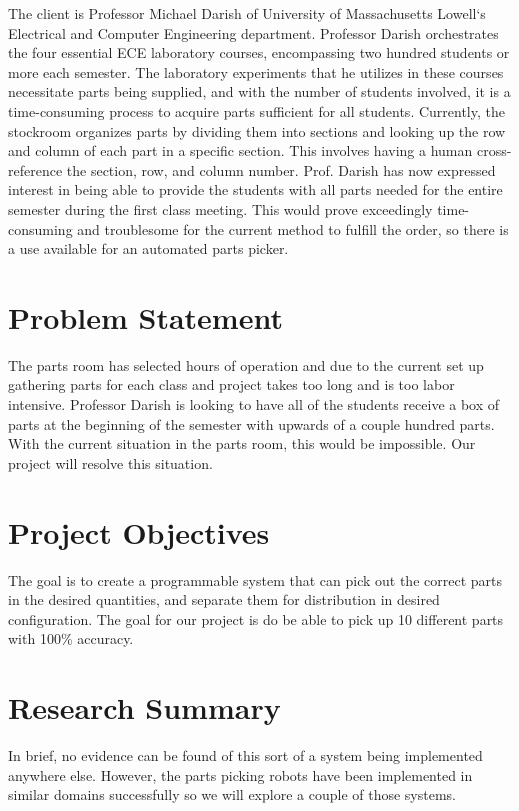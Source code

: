 \documentclass[12pt]{report}
\begin{document}
The client is Professor Michael Darish of University of Massachusetts Lowell`s Electrical and Computer Engineering department.  Professor Darish orchestrates the four essential ECE laboratory courses, encompassing two hundred students or more each semester.  The laboratory experiments that he utilizes in these courses necessitate parts being supplied, and with the number of students involved, it is a time-consuming process to acquire parts sufficient for all students.  Currently, the stockroom organizes parts by dividing them into sections and looking up the row and column of each part in a specific section. This involves having a human cross-reference the section, row, and column number. Prof. Darish has now expressed interest in being able to provide the students with all parts needed for the entire semester during the first class meeting.  This would prove exceedingly time-consuming and troublesome for the current method to fulfill the order, so there is a use available for an automated parts picker.  

\section*{Problem Statement}

The parts room has selected hours of operation and due to the current set up gathering parts for each class and project takes too long and is too labor intensive. Professor Darish is looking to have all of the students receive a box of parts at the beginning of the semester with upwards of a couple hundred parts. With the current situation in the parts room, this would be impossible. Our project will resolve this situation. 

\section*{Project Objectives}

The goal is to create a programmable system that can pick out the correct parts in the desired quantities, and separate them for distribution in desired configuration.  The goal for our project is do be able to pick up 10 different parts with 100\% accuracy. 

\section*{Research Summary}
In brief, no evidence can be found of this sort of a system being implemented anywhere else. However, the parts picking robots have been implemented in similar domains successfully so we will explore a couple of those systems. 
	
\end{document}

